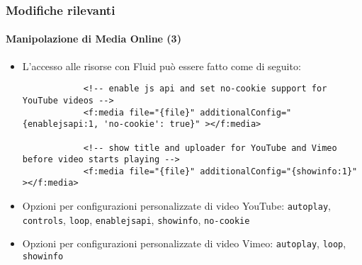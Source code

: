 \begin{frame}[fragile]
	\frametitle{Modifiche rilevanti}
	\framesubtitle{Manipolazione di Media Online (3)}

	\lstset{basicstyle=\tiny\ttfamily}

	\begin{itemize}

		\item L'accesso alle risorse con Fluid può essere fatto come di seguito:

		\begin{lstlisting}
			<!-- enable js api and set no-cookie support for YouTube videos -->
			<f:media file="{file}" additionalConfig="{enablejsapi:1, 'no-cookie': true}" ></f:media>

			<!-- show title and uploader for YouTube and Vimeo before video starts playing -->
			<f:media file="{file}" additionalConfig="{showinfo:1}" ></f:media>
		\end{lstlisting}

		\item Opzioni per configurazioni personalizzate di video YouTube:\newline
			\small
				\texttt{autoplay}, \texttt{controls}, \texttt{loop}, \texttt{enablejsapi}, \texttt{showinfo}, \texttt{no-cookie}
			\normalsize

		\item Opzioni per configurazioni personalizzate di video Vimeo:\newline
			\small
				\texttt{autoplay}, \texttt{loop}, \texttt{showinfo}
			\normalsize
	\end{itemize}

\end{frame}


